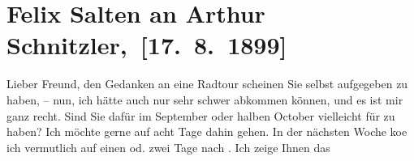 

\renewcommand{\erwaehntePersonen}{Personen: Richard Beer-Hofmann, Houston Stewart Chamberlain, Theodor Herzl, Ottilie Salten, Franz Servaes, Karl von Thaler, Jakob Wassermann}
\renewcommand{\erwaehnteInstitutionen}{Institutionen: Bruckmann Verlag, Neue Freie Presse}
\renewcommand{\erwaehnteOrte}{Orte: Bad Ischl, Dubrovnik, München, Seeboden, Wien}
\renewcommand{\erwaehnteWerke}{Werke: Decadence-Romane, Die Grundlagen des Neunzehnten Jahrhunderts. 2 Bde., Die Welt (Wien), Neue Freie Presse, Tagebuch, »Das fremde Volk«, »Das fremde Volk«. I., »Das fremde Volk«. II., »Das fremde Volk«. III.}
\section[ Felix Salten an Arthur Schnitzler, {[}17. 8. 1899{]}]{Felix Salten an Arthur Schnitzler, {[}17. 8. 1899{]}}
\nopagebreak{}
\rehead{ }\normalsize\beginnumbering{}
\toendnotes[C]{\smallbreak\pagebreak[2]}
\toendnotes[C]{\smallbreak}
\pstart
           \noindent{}{\pb}Lieber Freund, den Gedanken an eine Radtour scheinen Sie selbst
               aufgegeben zu haben, – nun, ich hätte auch nur sehr schwer abkommen können, und es
               ist mir ganz recht. Sind Sie dafür im September oder
               halben October vielleicht für \label{K_L03297-1v}\label{K_L03297-1h} zu haben? Ich
               möchte gerne auf acht Tage dahin gehen. In der nächsten Woche ko{\geminationm}e ich vermutlich auf einen od. zwei Tage nach \label{K_L03297-2v}\label{K_L03297-2h}. Ich zeige Ihnen das
